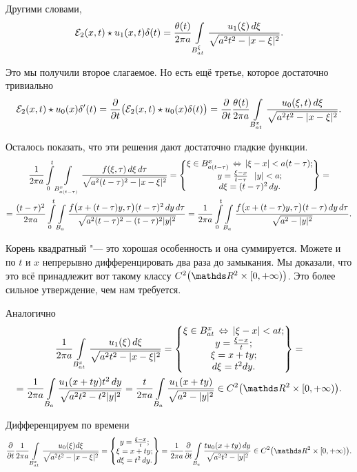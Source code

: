 Другими словами, 
\[
\mathcal E_2(x,t)\star u_1(x,t)\delta(t) = 
  \frac{\theta(t)}{2\pi a}\int\limits_{B^\xi_{at}} \frac{u_1(\xi)\,d\xi}{\sqrt{a^2t^2 - |x-\xi|^2}}.
\]

Это мы получили второе слагаемое. Но есть ещё третье, которое достаточно тривиально
\[
  \mathcal E_2(x,t)\star u_0(x)\delta'(t) = 
  \frac{\partial  }{\partial t}\big(\mathcal E_2(x,t)\star u_0(x)\delta(t)\big) = \frac{\partial  }{\partial t}\frac{\theta(t)}{2\pi a}\int\limits_{B^x_{at}}
	\frac{u_0(\xi,t)\,d\xi}{\sqrt{a^2t^2-|x-\xi|^2}}.
\]

Осталось показать, что эти решения дают достаточно гладкие функции. 
\begin{multline*}
 \frac1{2\pi a}\int\limits_0^t\int\limits_{B^x_{a(t-\tau)}}\frac{f(\xi,\tau)\,d\xi\,d\tau}{\sqrt{a^2(t-\tau)^2 - |x-\xi|^2}} = 
 \left\{
  \begin{matrix}
    \xi\in B_{a(t-\tau)}^x\,\Leftrightarrow\, |\xi-x|<a(t-\tau);\\
    y = \frac{\xi -x}{t-\tau}\hskip .75em plus.1em minus.08em\relax |y|<a;\\
   d\xi = (t-\tau)^2\,dy.
\end{matrix}
\right\}=\\
=\frac{(t-\tau)^2}{2\pi a}\int\limits_0^t \int\limits_{B_a}\frac{f\big(x+(t-\tau)y,\tau\big)(t-\tau)^2\,dy\,d\tau}{\sqrt{a^2(t-\tau)^2-(t-\tau)^2|y|^2}} 
= \frac1{2\pi a}\int\limits_0^t\int\limits_{B_a} \frac{f\big(x+(t-\tau)y,\tau\big)(t-\tau)\,dy\,d\tau}{\sqrt{a^2-|y|^2}}.
\end{multline*}

Корень квадратный "--- это хорошая особенность и она суммируется. Можете и по $t$ и $x$ непрерывно дифференцировать два раза до замыкания. Мы доказали, что это всё принадлежит вот такому классу $C^2\big(\R^2\times[0,+\infty)\big)$. Это более сильное утверждение, чем нам требуется.

Аналогично
\begin{multline*}
  \frac1{2\pi a} \Gint{B^x_{at}}\frac{u_1(\xi)\,d\xi}{\sqrt{a^2t^2-|x-\xi|^2}} = 
  \left\{
   \begin{matrix}
     \xi\in B^x_{at}\iff |\xi -x|<at;\\
     y = \frac{\xi -x}{t};\\
     \xi = x + ty;\\
    d\xi = t^2 dy.
\end{matrix}
  \right\} = \\
 = \frac1{2\pi a} \Gint{B_a}\frac{u_1(x+ty)t^2\,dy}{\sqrt{a^2t^2 - t^2|y|^2}} = 
   \frac t{2\pi a} \Gint{B_a}\frac{u_1(x+ty)}{\sqrt{a^2 - |y|^2}}\in C^2\big(\R^2\times[0,+\infty)\big).
\end{multline*}

Дифференцируем по времени
\[
  \CP{ }t\frac1{2\pi a}\Gint{B_{at}^x} \frac{u_0(\xi)d\xi}{\sqrt{a^2t^2 - |x-\xi|^2}} = 
  \left\{\begin{matrix}
    y = \frac{\xi -x}t;\\
    \xi = x+ty;\\
    d\xi = t^2\,dy.
  \end{matrix}
  \right\} = 
\frac1{2\pi a}\CP{ }t\Gint{B_a} \frac{t u_0(x+ty)\,dy}{\sqrt{a^2t^2-|y|^2}}\in C^2\big(\R^2\times[0,+\infty)\big).
\]
